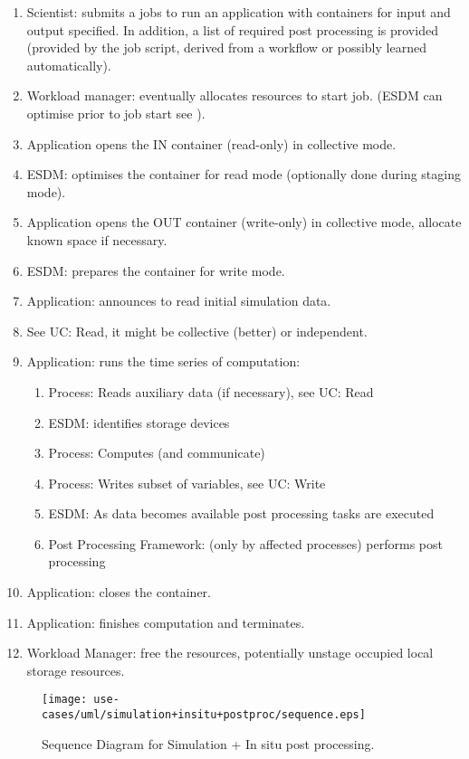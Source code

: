 \begin{enumerate}
	\item Scientist: submits a jobs to run an application with containers for input and output specified. In addition, a list of required post processing is provided (provided by the job script, derived from a workflow or possibly learned automatically).
	\item Workload manager: eventually allocates resources to start job. (ESDM can optimise prior to job start see ).
	\item Application opens the IN container (read-only) in collective mode.
	\item ESDM: optimises the container for read mode (optionally done during staging mode).
	\item Application opens the OUT container (write-only) in collective mode, allocate known space if necessary.
	\item ESDM: prepares the container for write mode.
	\item Application: announces to read initial simulation data.
	\item See UC: Read, it might be collective (better) or independent.
	\item Application: runs the time series of computation:
	\begin{enumerate}
		\item Process: Reads auxiliary data (if necessary), see UC: Read
		\item ESDM: identifies storage devices
		\item Process: Computes (and communicate)
		\item Process: Writes subset of variables, see UC: Write
		\item ESDM: As data becomes available post processing tasks are executed
		\item Post Processing Framework: (only by affected processes) performs post processing
	\end{enumerate}
	\item Application: closes the container.
	\item Application: finishes computation and terminates.
	\item Workload Manager: free the resources, potentially unstage occupied local storage resources.
\end{enumerate}


\begin{figure}
	\centering
	\texttt{[image: use-cases/uml/simulation+insitu+postproc/sequence.eps]}
	\caption{Sequence Diagram for Simulation + In situ post processing.}
	\label{fig:sequence in-situ}
\end{figure}





